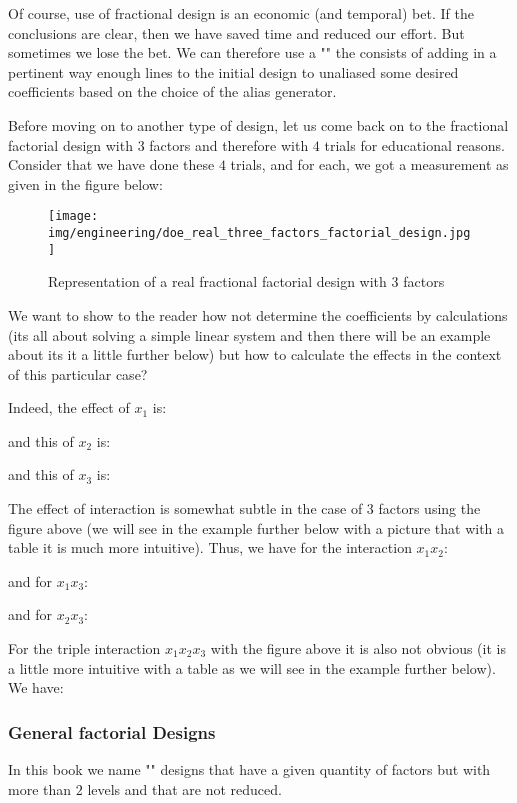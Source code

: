 	Of course, use of fractional design is an economic (and temporal) bet. If the conclusions are clear, then we have saved time and reduced our effort. But sometimes we lose the bet. We can therefore use a "" the consists of adding in a pertinent way enough lines to the initial design to unaliased some desired coefficients based on the choice of the alias generator.
	
	Before moving on to another type of design, let us come back on to the fractional factorial design with $3$ factors and therefore with $4$ trials for educational reasons. Consider that we have done these $4$ trials, and for each, we got a measurement as given in the figure below:
	\begin{figure}[H]
		\begin{center}
		\texttt{[image: img/engineering/doe\_real\_three\_factors\_factorial\_design.jpg]}
		\end{center}	
		\caption{Representation of a real fractional factorial design with $3$ factors}
	\end{figure}
	We want to show to the reader how not determine the coefficients by calculations (its all about solving a simple linear system and then there will be an example about its it a little further below) but how to calculate the effects in the context of this particular case?

	Indeed, the effect of $x_1$ is:
	
	and this of $x_2$ is:
	
	and this of $x_3$ is:
	
	The effect of interaction is somewhat subtle in the case of $3$ factors using the figure above (we will see in the example further below with a picture that with a table it is much more intuitive). Thus, we have for the interaction $x_1x_2$:
	
	and for $x_1x_3$:
	
	and for $x_2x_3$:
	
	
	For the triple interaction $x_1x_2x_3$ with the figure above it is also not obvious (it is a little more intuitive with a table as we will see in the example further below). We have:
	
	
	\pagebreak
	\subsubsection{General factorial Designs}
	In this book we name "" designs that have a given quantity of factors but with more than $2$ levels and that are not reduced. 
	
